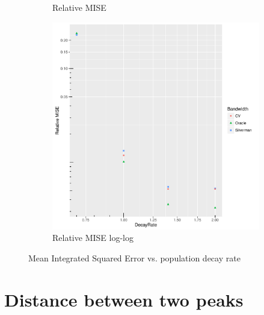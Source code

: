 \begin{figure}[htbp]
\begin{subfigure}[b]{0.3\textwidth}
    \caption{Relative MISE}
    \end{subfigure}
    \begin{subfigure}[b]{0.3\textwidth}
    \includegraphics[width=\textwidth]{results/by_population_decay/RMISE-vs-population-decay-log-log}
    \caption{Relative MISE log-log}
    \end{subfigure}
    \caption[MISE: by risk decay]{Mean Integrated Squared Error vs. population decay rate}
    \label{fig:ise:pSD_100_1h}
\end{figure}


\section{Distance between two peaks}
\label{sec:results:p1.4_100_G}

